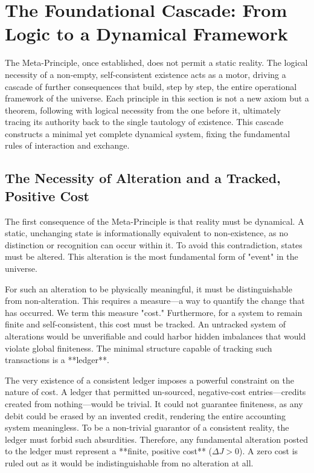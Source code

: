 \section{The Foundational Cascade: From Logic to a Dynamical Framework}

The Meta-Principle, once established, does not permit a static reality. The logical necessity of a non-empty, self-consistent existence acts as a motor, driving a cascade of further consequences that build, step by step, the entire operational framework of the universe. Each principle in this section is not a new axiom but a theorem, following with logical necessity from the one before it, ultimately tracing its authority back to the single tautology of existence. This cascade constructs a minimal yet complete dynamical system, fixing the fundamental rules of interaction and exchange.

\subsection{The Necessity of Alteration and a Tracked, Positive Cost}
The first consequence of the Meta-Principle is that reality must be dynamical. A static, unchanging state is informationally equivalent to non-existence, as no distinction or recognition can occur within it. To avoid this contradiction, states must be altered. This alteration is the most fundamental form of "event" in the universe.

For such an alteration to be physically meaningful, it must be distinguishable from non-alteration. This requires a measure—a way to quantify the change that has occurred. We term this measure "cost." Furthermore, for a system to remain finite and self-consistent, this cost must be tracked. An untracked system of alterations would be unverifiable and could harbor hidden imbalances that would violate global finiteness. The minimal structure capable of tracking such transactions is a **ledger**.

The very existence of a consistent ledger imposes a powerful constraint on the nature of cost. A ledger that permitted un-sourced, negative-cost entries—credits created from nothing—would be trivial. It could not guarantee finiteness, as any debit could be erased by an invented credit, rendering the entire accounting system meaningless. To be a non-trivial guarantor of a consistent reality, the ledger must forbid such absurdities. Therefore, any fundamental alteration posted to the ledger must represent a **finite, positive cost** (\(\Delta J > 0\)). A zero cost is ruled out as it would be indistinguishable from no alteration at all.

